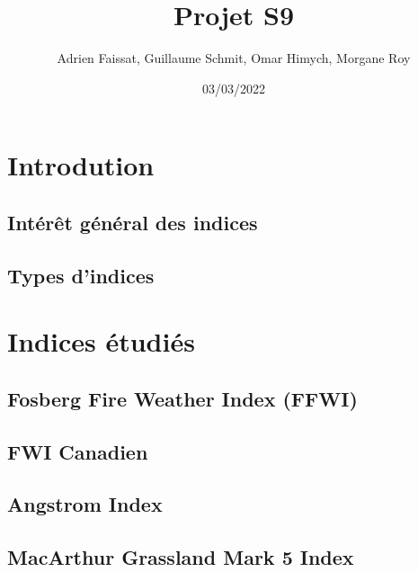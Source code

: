 \documentclass[
]{article}
\title{Projet S9}
\author{Adrien Faissat, Guillaume Schmit, Omar Himych, Morgane Roy}
\date{03/03/2022}
\begin{document}
\maketitle

\hypertarget{introdution}{%
\section{Introdution}\label{introdution}}

\hypertarget{intuxe9ruxeat-guxe9nuxe9ral-des-indices}{%
\subsection{Intérêt général des
indices}\label{intuxe9ruxeat-guxe9nuxe9ral-des-indices}}

\hypertarget{types-dindices}{%
\subsection{Types d'indices}\label{types-dindices}}

\hypertarget{indices-uxe9tudiuxe9s}{%
\section{Indices étudiés}\label{indices-uxe9tudiuxe9s}}

\hypertarget{fosberg-fire-weather-index-ffwi}{%
\subsection{Fosberg Fire Weather Index
(FFWI)}\label{fosberg-fire-weather-index-ffwi}}

\hypertarget{fwi-canadien}{%
\subsection{FWI Canadien}\label{fwi-canadien}}

\hypertarget{angstrom-index}{%
\subsection{Angstrom Index}\label{angstrom-index}}

\hypertarget{macarthur-grassland-mark-5-index}{%
\subsection{MacArthur Grassland Mark 5
Index}\label{macarthur-grassland-mark-5-index}}
\end{document}
